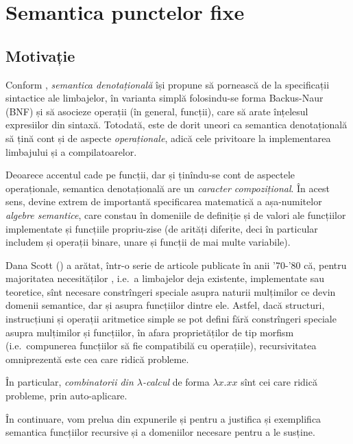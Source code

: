 \chapter{Semantica punctelor fixe}

\section{Motivație}

\indent\indent Conform \cite{schm}, \emph{semantica denotațională} își propune să pornească de la
spe\-ci\-fi\-ca\-ții sintactice ale limbajelor, în varianta simplă folosindu-se
forma Backus-Naur (BNF) și să asocieze operații (în general, funcții),
care să arate înțelesul expresiilor din sintaxă. Totodată, este de dorit
uneori ca semantica denotațională să țină cont și de aspecte \emph{operaționale},
adică cele privitoare la implementarea limbajului și a compilatoarelor.

Deoarece accentul cade pe funcții, dar și ținîndu-se cont de aspectele
operaționale, semantica denotațională are un \emph{caracter compozițional}. În acest
sens, devine extrem de importantă specificarea matematică a așa-numitelor
\emph{algebre semantice}, care constau în domeniile de definiție și de valori
ale funcțiilor implementate și funcțiile propriu-zise (de arități diferite, deci
în particular includem și operații binare, unare și funcții de mai multe variabile).

Dana Scott (\cite{scottstrachey}) a arătat, într-o serie de articole publicate în
anii '70-'80 că, pentru majoritatea necesităților , i.e.\ a limbajelor deja
existente, implementate sau teoretice, sînt necesare constrîngeri speciale asupra
naturii mulțimilor ce devin domenii semantice, dar și asupra funcțiilor dintre ele.
Astfel, dacă structuri, instrucțiuni și operații aritmetice simple se pot defini
fără constrîngeri speciale asupra mulțimilor și funcțiilor, în afara proprietăților
de tip morfism (i.e.\ compunerea funcțiilor să fie compatibilă cu operațiile),
recursivitatea omniprezentă este cea care ridică probleme.

În particular, \emph{combinatorii din $\lambda$-calcul} de forma $ \lambda x . xx $ sînt
cei care ridică probleme, prin auto-aplicare.

În continuare, vom prelua din expunerile \cite{abrj} și \cite{schm} pentru a justifica
și exemplifica semantica funcțiilor recursive și a domeniilor necesare pentru a le
susține.


